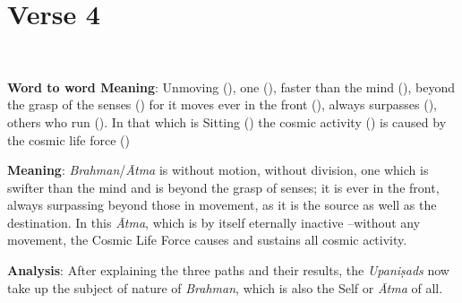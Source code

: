 \chapter{Verse 4}

\begin{moolashloka}
\\
\end{moolashloka}

\textbf{Word to word Meaning}: Unmoving (), one (), faster than the mind (), beyond the grasp of the senses () for it moves ever in the front (), always surpasses (), others who run (). In that which is Sitting () the cosmic activity () is caused by the cosmic life force ()

\textbf{Meaning}: \emph{Brahman}/\emph{Ātma} is without motion, without division, one which is swifter than the mind and is beyond the grasp of senses; it is ever in the front, always surpassing beyond those in movement, as it is the source as well as the destination. In this \emph{Ātma}, which is by itself eternally inactive --without any movement, the Cosmic Life Force causes and sustains all cosmic activity.

\textbf{Analysis}: After explaining the three paths and their results, the \emph{Upaniṣads} now take up the subject of nature of \emph{Brahman}, which is also the Self or \emph{Ātma} of all.

